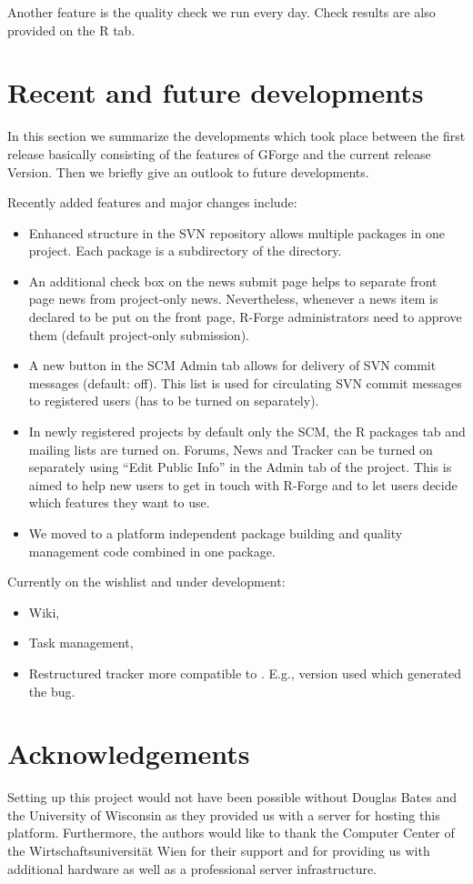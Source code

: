 Another feature is the quality check we run every day. Check results
are also provided on the R tab.


\section*{Recent and future developments}
In this section we summarize the developments which took place between
the first release basically consisting of the features of GForge and
the current release Version. Then we briefly give an outlook to future
developments.

Recently added features and major changes include:
\begin{itemize}
\item Enhanced structure in the SVN repository allows multiple
  packages in one project. Each package is a subdirectory of the
   directory.
\item An additional check box on the news submit page helps to
  separate front page news from project-only news. Nevertheless,
  whenever a news item is declared to be put on the front page,
  R-Forge administrators need to approve them (default project-only
  submission).
\item A new button in the SCM Admin tab allows for delivery of SVN
  commit messages (default: off).  This
  list is used for circulating SVN commit messages to registered
  users (has to be turned on separately).
\item In newly registered projects by default only the SCM, the R
  packages tab and mailing lists are turned on. Forums, News and
  Tracker can be turned on separately using ``Edit Public Info'' in
  the Admin tab of the project. This is aimed to help new users to get
  in touch with R-Forge and to let users decide which features they
  want to use.
\item We moved to a platform independent package building and quality
  management code combined in one \R{} package.
\end{itemize}

Currently on the wishlist and under development:
\begin{itemize}
\item Wiki,
\item Task management,
\item Restructured tracker more compatible to \R{}. E.g., \R{} version
  used which generated the bug.  
\end{itemize}


\section{Acknowledgements}

Setting up this project would not have been possible without Douglas
Bates and the University of Wisconsin as they provided us with a
server for hosting this platform. Furthermore, 
the authors would like to thank the Computer Center 
of the Wirtschaftsuniversit\"at Wien for
their support and for providing us with additional hardware as well as a
professional server infrastructure.

